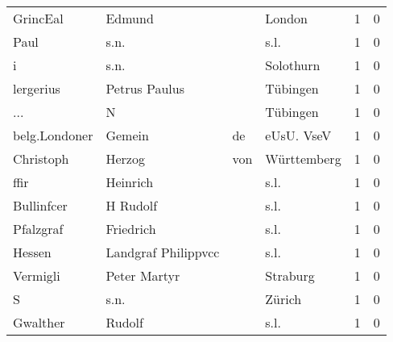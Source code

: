 \begin{center}
\begin{tiny}
\begin{longtabu}{llllrr}
                 GrincEal &                             Edmund &             &                                      London &          1 &         0 \\
                     Paul &                               s.n. &             &                                        s.l. &          1 &         0 \\
                        i &                               s.n. &             &                                   Solothurn &          1 &         0 \\
                lergerius &                      Petrus Paulus &             &                                    Tübingen &          1 &         0 \\
                      ... &                                  N &             &                                    Tübingen &          1 &         0 \\
            belg.Londoner &                             Gemein &          de &                                  eUsU. VseV &          1 &         0 \\
                Christoph &                             Herzog &         von &                                 Württemberg &          1 &         0 \\
                     ffir &                           Heinrich &             &                                        s.l. &          1 &         0 \\
               Bullinfcer &                           H Rudolf &             &                                        s.l. &          1 &         0 \\
                Pfalzgraf &                          Friedrich &             &                                        s.l. &          1 &         0 \\
                   Hessen &                Landgraf Philippvcc &             &                                        s.l. &          1 &         0 \\
                 Vermigli &                       Peter Martyr &             &                                    Straburg &          1 &         0 \\
                        S &                               s.n. &             &                                      Zürich &          1 &         0 \\
                 Gwalther &                             Rudolf &             &                                        s.l. &          1 &         0 \\

\end{longtabu}
\end{tiny}
\end{center}
